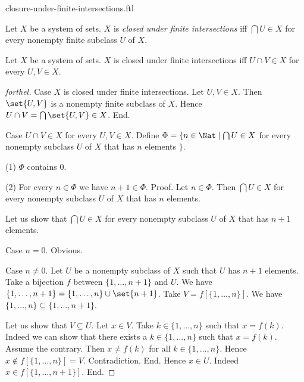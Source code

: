 \documentclass{naproche-library}
\begin{document}
\begin{smodule}[title=Closure Under Finite Intersections]{closure-under-finite-intersections.ftl}

\begin{definition}[forthel,id=FOUNDATIONS_14_4297814324543488]
  Let $X$ be a system of sets.
  $X$ is \emph{closed under finite intersections} iff $\bigcap U \in X$ for every nonempty finite subclass $U$ of $X$.
\end{definition}

\begin{proposition}[forthel,id=FOUNDATIONS_17_1405012582334464]
  Let $X$ be a system of sets.
  $X$ is closed under finite intersections iff $U \cap V \in X$ for every $U, V \in X$.
\end{proposition}
\begin{proof}[forthel]
  Case $X$ is closed under finite intersections.
    Let $U, V \in X$.
    Then $\set{U, V}$ is a nonempty finite subclass of $X$.
    Hence $U \cap V = \bigcap \set{U, V} \in X$.
  End.

  Case $U \cap V \in X$ for every $U, V \in X$.
    Define $\Phi = \{ n \in \Nat \mid \bigcap U \in X$ for every nonempty subclass $U$ of $X$ that has $n$ elements $\}$.

    (1) $\Phi$ contains $0$.

    (2) For every $n \in \Phi$ we have $n + 1 \in \Phi$. \newline
    Proof.
      Let $n \in \Phi$.
      Then $\bigcap U \in X$ for every nonempty subclass $U$ of $X$ that has $n$ elements.

      Let us show that $\bigcap U \in X$ for every nonempty subclass $U$ of $X$ that has $n + 1$ elements.

        Case $n = 0$. Obvious.

        Case $n \neq 0$.
          Let $U$ be a nonempty subclass of $X$ such that $U$ has $n + 1$ elements.
          Take a bijection $f$ between $\{1, \dots, n + 1 \}$ and $U$.
          We have $\{ 1, \dots, n + 1 \} = \{ 1, \dots, n \} \cup \set{n + 1}$.
          Take $V = f[\{ 1, \dots, n \}]$.
          We have $\{ 1, \dots, n \} \subseteq \{ 1, \dots, n + 1 \}$.

          Let us show that $V \subseteq U$.
            Let $x \in V$.
            Take $k \in \{ 1, \dots, n \}$ such that $x = f(k)$.
            Indeed we can show that there exists a $k \in \{ 1, \dots, n \}$ such that $x = f(k)$.
              Assume the contrary.
              Then $x \neq f(k)$ for all $k \in \{ 1, \dots, n \}$.
              Hence $x \notin f[\{ 1, \dots, n \}] = V$.
              Contradiction.
            End.
            Hence $x \in U$.
            Indeed $x \in f[\{ 1, \dots, n + 1 \}]$.
          End.


\end{proof}
\end{smodule}
\end{document}
